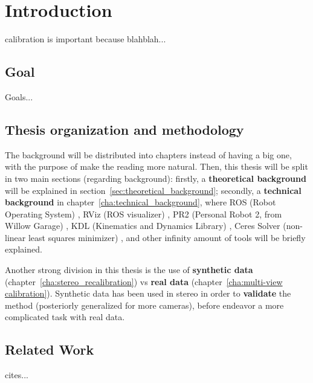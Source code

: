\chapter{Introduction}
\label{cha:intro}


calibration is important because blahblah...


\section{Goal}

Goals...


\section{Thesis organization and methodology}

The background will be distributed into chapters instead of having a big one, with the purpose of make the reading more natural. Then, this thesis will be split in two main sections (regarding background): firstly, a \textbf{theoretical background} will be explained in section~\ref{sec:theoretical_background}; secondly, a \textbf{technical background} in chapter~\ref{cha:technical_background}, where ROS (Robot Operating System) \cite{ROS}, RViz (ROS visualizer) \cite{RViz}, PR2 (Personal Robot 2, from Willow Garage) \cite{PR2}, KDL (Kinematics and Dynamics Library) \cite{KDL}, Ceres Solver (non-linear least squares minimizer) \cite{ceres}, and other infinity amount of tools will be briefly explained.

Another strong division in this thesis is the use of \textbf{synthetic data} (chapter~\ref{cha:stereo_recalibration}) vs \textbf{real data} (chapter~\ref{cha:multi-view calibration}). Synthetic data has been used in stereo in order to \textbf{validate} the method (posteriorly generalized for more cameras), before endeavor a more complicated task with real data.






\section{Related Work}

cites...
